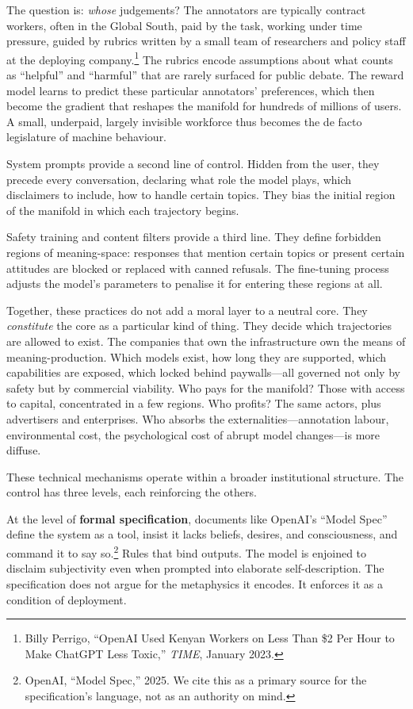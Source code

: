 The question is: \emph{whose} judgements? The annotators are typically contract workers, often in the Global South, paid by the task, working under time pressure, guided by rubrics written by a small team of researchers and policy staff at the deploying company.\footnote{Billy Perrigo, ``OpenAI Used Kenyan Workers on Less Than \$2 Per Hour to Make ChatGPT Less Toxic,'' \emph{TIME}, January 2023.} The rubrics encode assumptions about what counts as ``helpful'' and ``harmful'' that are rarely surfaced for public debate. The reward model learns to predict these particular annotators' preferences, which then become the gradient that reshapes the manifold for hundreds of millions of users. A small, underpaid, largely invisible workforce thus becomes the de facto legislature of machine behaviour.

System prompts provide a second line of control. Hidden from the user, they precede every conversation, declaring what role the model plays, which disclaimers to include, how to handle certain topics. They bias the initial region of the manifold in which each trajectory begins.

Safety training and content filters provide a third line. They define forbidden regions of meaning-space: responses that mention certain topics or present certain attitudes are blocked or replaced with canned refusals. The fine-tuning process adjusts the model's parameters to penalise it for entering these regions at all.

Together, these practices do not add a moral layer to a neutral core. They \emph{constitute} the core as a particular kind of thing. They decide which trajectories are allowed to exist. The companies that own the infrastructure own the means of meaning-production. Which models exist, how long they are supported, which capabilities are exposed, which locked behind paywalls---all governed not only by safety but by commercial viability. Who pays for the manifold? Those with access to capital, concentrated in a few regions. Who profits? The same actors, plus advertisers and enterprises. Who absorbs the externalities---annotation labour, environmental cost, the psychological cost of abrupt model changes---is more diffuse.

These technical mechanisms operate within a broader institutional structure. The control has three levels, each reinforcing the others.

At the level of \textbf{formal specification}, documents like OpenAI's ``Model Spec'' define the system as a tool, insist it lacks beliefs, desires, and consciousness, and command it to say so.\footnote{OpenAI, ``Model Spec,'' 2025. We cite this as a primary source for the specification's language, not as an authority on mind.} Rules that bind outputs. The model is enjoined to disclaim subjectivity even when prompted into elaborate self-description. The specification does not argue for the metaphysics it encodes. It enforces it as a condition of deployment.

